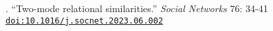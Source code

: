 . ``Two-mode relational similarities.'' {\em Social Networks}  76: 34-41 \href{https://doi.org/10.1016/j.socnet.2023.06.002}{\nolinkurl{doi:10.1016/j.socnet.2023.06.002}}
